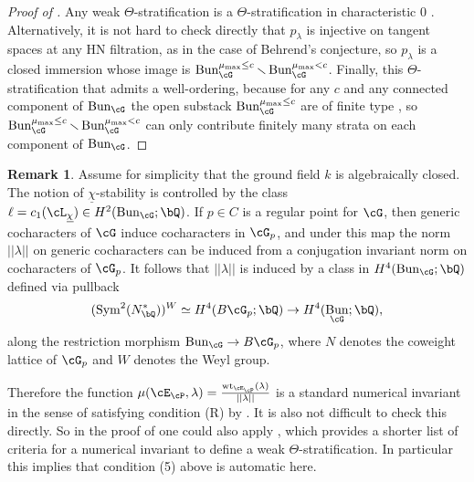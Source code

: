 \documentclass[a4paper]{amsart}
\numberwithin{equation}{section}
\theoremstyle{plain}
\theoremstyle{definition}
\newtheorem{rem}[thm]{Remark}
\newcommand{\op}[1]{\!\!\mathop{\rm ~#1}\nolimits}
\DeclareMathOperator{\Bun}{Bun}
\DeclareMathOperator{\wt}{wt}
\begin{document}
\begin{proof}[Proof of ]
Any weak $\Theta$-stratification is a $\Theta$-stratification in characteristic $0$ \cite[Cor.~2.6.1]{hlinstability}. Alternatively, it is not hard to check directly that $p_\lambda$ is injective on tangent spaces at any HN filtration, as in the case of Behrend's conjecture, so $p_\lambda$ is a closed immersion whose image is $\Bun_{\cG}^{\mu_{\max}\leq c}\smallsetminus \Bun_{\cG}^{\mu_{\max}<c}$. Finally, this $\Theta$-stratification that admits a well-ordering, because for any $c$ and any connected component of $\Bun_{\cG}$ the open substack $\Bun_{\cG}^{\mu_{\max}\leq c}$ are of finite type \cite[Prop.~3.18]{heinloth-stability}, so $\Bun_{\cG}^{\mu_{\max}\leq c}\smallsetminus \Bun_{\cG}^{\mu_{\max}< c}$ can only contribute finitely many strata on each component of $\Bun_{\cG}$.
\end{proof}

\begin{rem}
Assume for simplicity that the ground field $k$ is algebraically closed. The notion of $\underline{\chi}$-stability is controlled by the class $\ell = c_1(\cL_{\underline{\chi}}) \in H^2(\Bun_\cG;\bQ)$. If $p \in C$ is a regular point for $\cG$, then generic cocharacters of $\cG$ induce cocharacters in $\cG_p$, and under this map the norm $||\lambda||$ on generic cocharacters can be induced from a conjugation invariant norm on cocharacters of $\cG_p$. It follows that $||\lambda||$ is induced by a class in $H^4(\Bun_\cG;\bQ)$ defined via pullback
\[
(\op{Sym}^2(N^\ast_\bQ))^W \simeq H^4(B\cG_p;\bQ) \to H^4(\Bun_\cG;\bQ),
\]
along the restriction morphism $\Bun_\cG \to B \cG_p$, where $N$ denotes the coweight lattice of $\cG_p$ and $W$ denotes the Weyl group.

Therefore the function $\mu(\cE_\cP,\lambda) = \frac{\wt_{\cE_\cP}(\lambda)}{||\lambda||}$ is a standard numerical invariant in the sense of \cite[Def.~4.1.10]{hlinstability} satisfying condition (R) by \cite[Lem.~4.1.15, Lem.~4.1.16]{hlinstability}. It is also not difficult to check this directly. %
So in the proof of  one could also apply \cite[Thm.~4.5.1]{hlinstability}, which provides a shorter list of criteria for a numerical invariant to define a weak $\Theta$-stratification. In particular this implies that condition (5) above is automatic here.
\end{rem}
\end{document}
